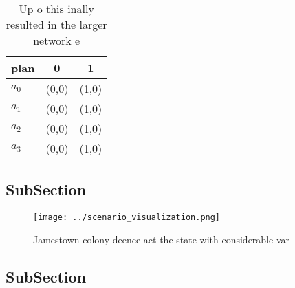 \documentclass[a4paper]{article}
\begin{document}
\begin{table}
\begin{adjustbox}{width=1\columnwidth}
\begin{tabular}{|l|l|l|}
\hline
\textbf{plan} & \multicolumn{1}{c|}{\textbf{0}} & \multicolumn{1}{c|}{\textbf{1}} \\ \hline
\textbf{$a_0$}  & (0,0) & (1,0) \\ \hline
\textbf{$a_1$}  & (0,0) & (1,0) \\ \hline
\textbf{$a_2$}  & (0,0) & (1,0) \\ \hline
\textbf{$a_3$}  & (0,0) & (1,0) \\ \hline
\end{tabular}
\end{adjustbox}
\caption{Up o this inally resulted in the larger network e
}
\end{table}

\subsection{SubSection}

\begin{figure}
\centering
\texttt{[image: ../scenario\_visualization.png]}
\caption{Jamestown colony deence act the state with considerable var
}
\end{figure}
 
\subsection{SubSection}
\end{document}
